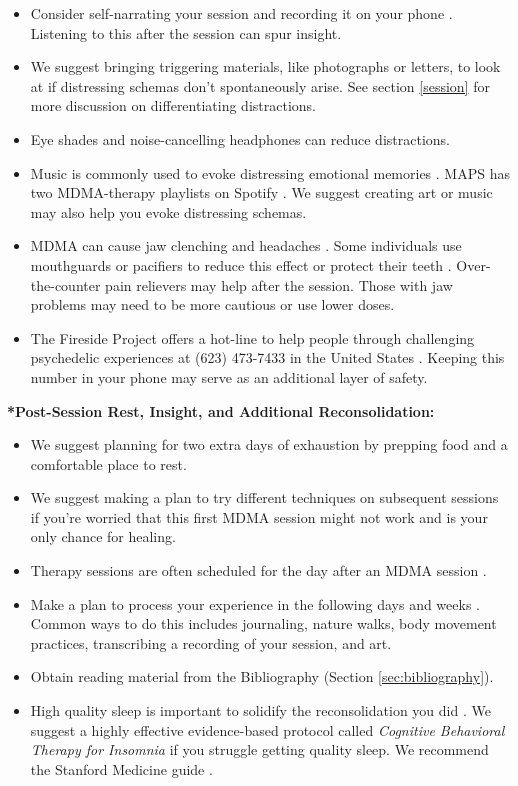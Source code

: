 \documentclass[12pt,letterpaper]{article}
\begin{document}
\begin{itemize}
    \item Consider self-narrating your session and recording it on your phone \cite{mithoeferManual}. Listening to this after the session can spur insight.
    \item We suggest bringing triggering materials, like photographs or letters, to look at if distressing schemas don't spontaneously arise. See section \ref{session} for more discussion on differentiating distractions.
    \item Eye shades and noise-cancelling headphones can reduce distractions.
    \item Music is commonly used to evoke distressing emotional memories \cite{mithoeferManual}. MAPS has two MDMA-therapy playlists on Spotify \cite{mapsMusicA,mapsMusicB}. We suggest creating art or music may also help you evoke distressing schemas.
    \item MDMA can cause jaw clenching and headaches \cite{mitchellMDMAClinicalTrial2,liechtiGender}. Some individuals use mouthguards or pacifiers to reduce this effect or protect their teeth \cite{emdeEmergency}. Over-the-counter pain relievers may help after the session. Those with jaw problems may need to be more cautious or use lower doses. 
    \item The Fireside Project offers a hot-line to help people through challenging psychedelic experiences at (623) 473-7433 in the United States \cite{firesideProject}. Keeping this number in your phone may serve as an additional layer of safety.
\end{itemize}
\noindent \textbf{*Post-Session Rest, Insight, and Additional Reconsolidation:}
\begin{itemize}
    \item We suggest planning for two extra days of exhaustion by prepping food and a comfortable place to rest. 
    \item We suggest making a plan to try different techniques on subsequent sessions if you're worried that this first MDMA session might not work and is your only chance for healing.
    \item Therapy sessions are often scheduled for the day after an MDMA session \cite{mithoeferManual}. 
    \item Make a plan to process your experience in the following days and weeks \cite{mithoeferManual}. Common ways to do this includes journaling, nature walks, body movement practices, transcribing a recording of your session, and art. 
    \item Obtain reading material from the Bibliography (Section \ref{sec:bibliography}).
    \item High quality sleep is important to solidify the reconsolidation you did \cite{walkerSleep}. We suggest a highly effective evidence-based protocol called \textit{Cognitive Behavioral Therapy for Insomnia} if you struggle getting quality sleep. We recommend the Stanford Medicine guide \cite{stanfordSleep}.
\end{itemize}
\end{document}
